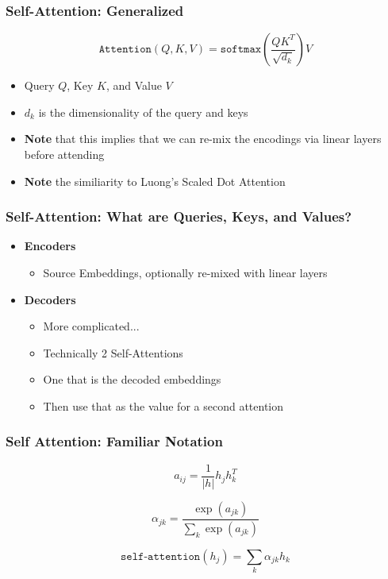 \documentclass[usenames,dvipsnames]{beamer}
\begin{document}
\begin{frame}
  \frametitle{Self-Attention: Generalized}
  \begin{equation*}
    \texttt{Attention}\left(Q, K, V \right) = \texttt{softmax}\left(\frac{QK^T}{\sqrt{d_k}}\right) V
  \end{equation*}
  \begin{itemize}
    \item Query $Q$, Key $K$, and Value $V$
    \item $d_k$ is the dimensionality of the query and keys
    \item \textbf{Note} that this implies that we can re-mix the encodings via linear layers before attending
    \item \textbf{Note} the similiarity to Luong's Scaled Dot Attention
  \end{itemize}
\end{frame}

\begin{frame}
  \frametitle{Self-Attention: What are Queries, Keys, and Values?}
  \begin{itemize}
    \item \textbf{Encoders}
    \begin{itemize}
      \item Source Embeddings, optionally re-mixed with linear layers
    \end{itemize}
  \end{itemize}
  \begin{itemize}
    \item \textbf{Decoders}
    \begin{itemize}
      \item More complicated...
      \item Technically 2 Self-Attentions
      \item One that is the decoded embeddings
      \item Then use that as the value for a second attention
    \end{itemize}
  \end{itemize}
\end{frame}

\begin{frame}
\frametitle{Self Attention: Familiar Notation}
\begin{equation*}
  a_{ij} = \frac{1}{|h|} h_{j}h_k^T
\end{equation*}

\begin{equation*}
  \alpha_{jk} = \frac{\exp\left( a_{jk} \right)}{\sum_k \exp \left( a_{jk} \right)}
\end{equation*}

\begin{equation*}
  \texttt{self-attention}\left( h_j \right) = \sum_k \alpha_{jk} h_k
\end{equation*}
\end{frame}
\end{document}
